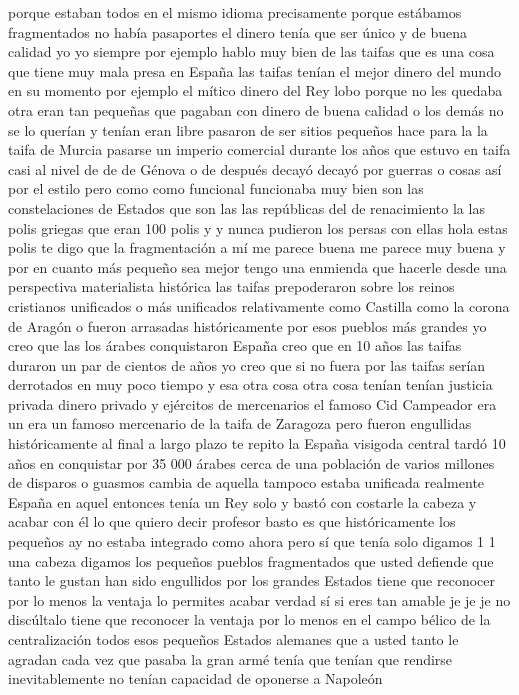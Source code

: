 porque estaban todos en el mismo idioma precisamente porque estábamos fragmentados no había pasaportes el dinero tenía que ser único y de buena calidad
yo yo siempre por ejemplo hablo muy bien de las taifas que es una cosa que tiene muy mala presa en España
las taifas tenían el mejor dinero del mundo en su momento por ejemplo el mítico dinero del Rey lobo
porque no les quedaba otra eran tan pequeñas que pagaban con dinero de buena calidad o los demás no se lo querían y tenían eran libre
pasaron de ser sitios pequeños hace para la la taifa de Murcia pasarse un imperio comercial
durante los años que estuvo en taifa casi al nivel de de de Génova o de después decayó decayó por guerras o cosas así por el estilo
pero como como funcional funcionaba muy bien son las constelaciones de Estados que son las las repúblicas del de renacimiento
la las polis griegas que eran 100 polis y y nunca pudieron los persas con ellas
hola estas polis te digo que la fragmentación a mí me parece buena me parece muy buena y por en cuanto más pequeño sea
mejor tengo una enmienda que hacerle desde una perspectiva materialista histórica las taifas
prepoderaron sobre los reinos cristianos unificados o más unificados relativamente como Castilla
como la corona de Aragón o fueron arrasadas históricamente por esos pueblos más grandes yo creo que las
los árabes conquistaron España creo que en 10 años las taifas duraron un par de cientos de años
yo creo que si no fuera por las taifas serían derrotados en muy poco tiempo y esa otra cosa otra cosa tenían
tenían justicia privada dinero privado y ejércitos de mercenarios el famoso Cid Campeador era un
era un famoso mercenario de la taifa de Zaragoza pero fueron engullidas históricamente al final a largo plazo
te repito la España visigoda central tardó 10 años en conquistar por 35 000 árabes
cerca de una población de varios millones de disparos o guasmos cambia de aquella tampoco estaba unificada realmente España en aquel entonces
tenía un Rey solo y bastó con costarle la cabeza y acabar con él lo que quiero decir profesor basto
es que históricamente los pequeños ay no estaba integrado como ahora pero sí que tenía solo digamos 1 1
una cabeza digamos los pequeños pueblos fragmentados que usted defiende que tanto le gustan han sido engullidos por los grandes Estados
tiene que reconocer por lo menos la ventaja lo permites acabar verdad
sí si eres tan amable je je je no discúltalo tiene que reconocer la ventaja
por lo menos en el campo bélico de la centralización todos esos pequeños Estados alemanes
que a usted tanto le agradan cada vez que pasaba la gran armé tenía que tenían que rendirse inevitablemente no tenían capacidad de oponerse a Napoleón
